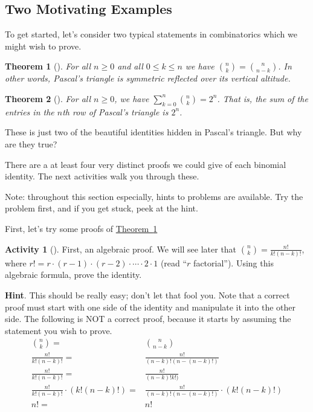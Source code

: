 \documentclass[10pt,]{book}
\theoremstyle{plain}
\newtheorem{theorem}{Theorem}[section]
\theoremstyle{definition}
\theoremstyle{definition}
\theoremstyle{definition}
\newtheorem{activity}[project]{Activity}
\theoremstyle{definition}
\numberwithin{equation}{chapter}
\newcommand{\amp}{&}
\begin{document}
\subsection[{Two Motivating Examples}]{Two Motivating Examples}\label{subsec-basic-proofs-examples}
\hypertarget{p-451}{}%
To get started, let's consider two typical statements in combinatorics which we might wish to prove.%
\begin{theorem}[{}]\label{thm-pascalsym}
\hypertarget{p-452}{}%
For all \(n \ge 0\) and all \(0 \le k \le n\) we have \(\binom{n}{k} = \binom{n}{n-k}\).  In other words, Pascal's triangle is symmetric reflected over its vertical altitude.%
\end{theorem}
\begin{theorem}[{}]\label{thm-pascalrowsum}
\hypertarget{p-453}{}%
For all \(n \ge 0\), we have \(\sum_{k=0}^n \binom{n}{k} = 2^n\).  That is, the sum of the entries in the \(n\)th row of Pascal's triangle is \(2^n\).%
\end{theorem}
\hypertarget{p-454}{}%
These is just two of the beautiful identities hidden in Pascal's triangle.  But why are they true?%
\par
\hypertarget{p-455}{}%
There are a at least four very distinct proofs we could give of each binomial identity.  The next activities walk you through these.%
\par
\hypertarget{p-456}{}%
Note: throughout this section especially, hints to problems are available.  Try the problem first, and if you get stuck, peek at the hint.%
\par
\hypertarget{p-457}{}%
First, let's try some proofs of \hyperref[thm-pascalsym]{Theorem~\ref{thm-pascalsym}}%
\begin{activity}[]\label{activity-15}
\hypertarget{p-458}{}%
First, an algebraic proof.  We will see later that \(\binom{n}{k} = \frac{n!}{k!(n-k)!}\), where \(r! = r \cdot (r-1) \cdot (r-2) \cdot\cdots\cdot 2\cdot 1\) (read ``\(r\) factorial'').  Using this algebraic formula, prove the identity.%
\par\smallskip%
\noindent\textbf{Hint}.\hypertarget{hint-4}{}\quad%
\hypertarget{p-459}{}%
This should be really easy; don't let that fool you.  Note that a correct proof must start with one side of the identity and manipulate it into the other side.  The following is NOT a correct proof, because it starts by assuming the statement you wish to prove.%
\begin{align*}
\binom{n}{k}  = \amp \binom{n}{n-k}\\
\frac{n!}{k!(n-k)!} =  \amp \frac{n!}{(n-k)!(n-(n-k)!)}\\
\frac{n!}{k!(n-k)!} =  \amp \frac{n!}{(n-k)!k!)}\\
\frac{n!}{k!(n-k)!} \cdot (k!(n-k)!)=  \amp \frac{n!}{(n-k)!(n-(n-k)!)}\cdot(k!(n-k)!)\\
n! =  \amp n!
\end{align*}
%
\end{activity}
\end{document}
